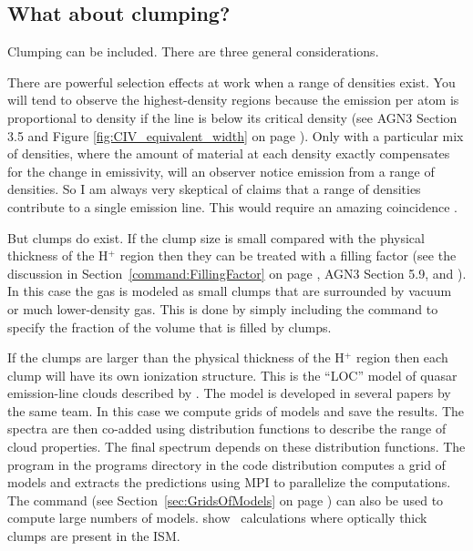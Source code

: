 \documentclass[12pt,twoside]{article}
\begin{document}
{\subsection{What about clumping?}

Clumping can be included.  There are three general considerations.

There are powerful selection effects at work when a range of densities
exist.  You will tend to observe the highest-density regions because the
emission per atom is proportional to density if the line is below its
critical density (see AGN3 Section 3.5 and
Figure \ref{fig:CIV_equivalent_width}
on page \pageref{fig:CIV_equivalent_width}).
Only with a particular mix of
densities, where the amount of material at each density exactly compensates
for the change in emissivity, will an observer notice emission from a range
of densities.  So I am always very skeptical of claims that a range of
densities contribute to a single emission line.
This would require an amazing coincidence 
\citep{Ferland.G11Molecular-hydrogen-in-NLSys-and-its-implications}.

But clumps do exist.
If the clump size is small compared with the
physical thickness of the H$^+$ region then they can be treated with a filling
factor (see the discussion in
Section~\ref{command:FillingFactor} on page
\pageref{command:FillingFactor},
 AGN3 Section 5.9, and \citet{Osterbrock1959}).
In this
case the gas is modeled as small clumps that are surrounded by vacuum or
much lower-density gas.
This is done by simply including the
 command to specify the fraction
of the volume that is filled by clumps.

If the clumps are larger than the physical thickness of the H$^+$ region
then each clump will have its own ionization structure.
This is the ``LOC''
model of quasar emission-line clouds described by
\citet{BaldwinEtAl95}.
The model is developed in several papers by the same team.
In this case
we compute grids of models and save the results.  The spectra are then
co-added using distribution functions to describe the range of cloud
properties.  The final spectrum depends on these distribution functions.
The program  in the programs directory in the code distribution
computes a grid of models and extracts the predictions using MPI to parallelize
the computations.
The  command (see
Section~\ref{sec:GridsOfModels} on page
\pageref{sec:GridsOfModels}) can also
be used to compute large numbers of models.
\citet{GiammancoEtAl_clumpsCloudy04} show \Cloudy\ calculations
where optically thick clumps are present in the ISM.

}
\end{document}
